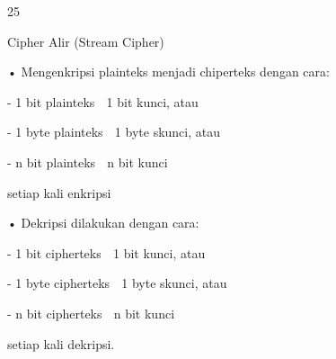 \documentclass{article}
\begin{document}

25

Cipher Alir (Stream Cipher)

• Mengenkripsi plainteks menjadi chiperteks dengan cara:

           - 1 bit plainteks   1 bit kunci, atau

           - 1 byte plainteks  1 byte skunci, atau

           - n bit plainteks  n bit kunci

   setiap kali enkripsi


• Dekripsi dilakukan dengan cara:

            - 1 bit cipherteks   1 bit kunci, atau

            - 1 byte cipherteks  1 byte skunci, atau

            - n bit cipherteks  n bit kunci

   setiap kali dekripsi.
\end{document}
